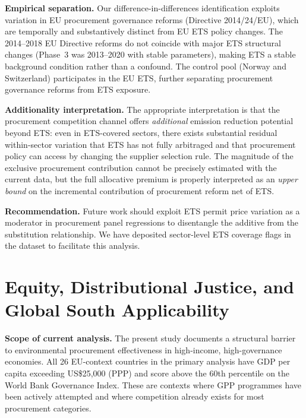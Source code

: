 \documentclass[11pt]{article}
\begin{document}
\textbf{Empirical separation.} Our difference-in-differences identification exploits variation in EU procurement governance reforms (Directive 2014/24/EU), which are temporally and substantively distinct from EU ETS policy changes. The 2014--2018 EU Directive reforms do not coincide with major ETS structural changes (Phase~3 was 2013--2020 with stable parameters), making ETS a stable background condition rather than a confound. The control pool (Norway and Switzerland) participates in the EU ETS, further separating procurement governance reforms from ETS exposure.

\textbf{Additionality interpretation.} The appropriate interpretation is that the procurement competition channel offers \textit{additional} emission reduction potential beyond ETS: even in ETS-covered sectors, there exists substantial residual within-sector variation that ETS has not fully arbitraged and that procurement policy can access by changing the supplier selection rule. The magnitude of the exclusive procurement contribution cannot be precisely estimated with the current data, but the full allocative premium is properly interpreted as an \textit{upper bound} on the incremental contribution of procurement reform net of ETS.

\textbf{Recommendation.} Future work should exploit ETS permit price variation as a moderator in procurement panel regressions to disentangle the additive from the substitution relationship. We have deposited sector-level ETS coverage flags in the dataset to facilitate this analysis.

\section{Equity, Distributional Justice, and Global South Applicability}
\label{sec:equity}

\textbf{Scope of current analysis.} The present study documents a structural barrier to environmental procurement effectiveness in high-income, high-governance economies. All 26 EU-context countries in the primary analysis have GDP per capita exceeding US\$25,000 (PPP) and score above the 60th percentile on the World Bank Governance Index. These are contexts where GPP programmes have been actively attempted and where competition already exists for most procurement categories.
\end{document}
